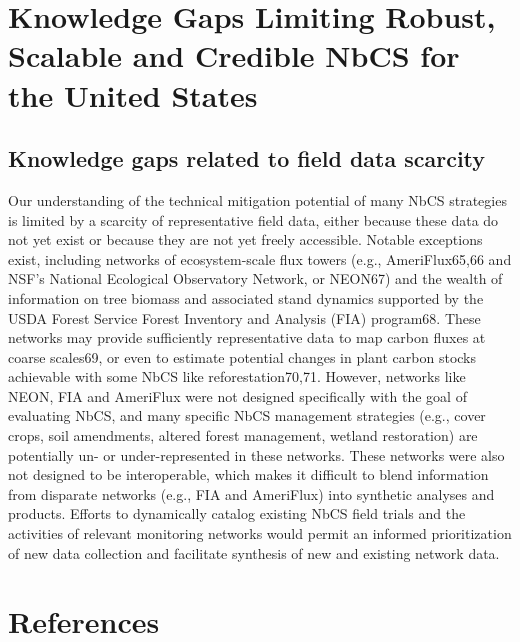 \documentclass[
  letterpaper,
  DIV=11,
  numbers=noendperiod]{scrreprt}
\begin{document}

\hypertarget{sec-knowledge}{%
\chapter{Knowledge Gaps Limiting Robust, Scalable and Credible NbCS for
the United States}\label{sec-knowledge}}

\hypertarget{knowledge-gaps-related-to-field-data-scarcity}{%
\section{Knowledge gaps related to field data
scarcity}\label{knowledge-gaps-related-to-field-data-scarcity}}

Our understanding of the technical mitigation potential of many NbCS
strategies is limited by a scarcity of representative field data, either
because these data do not yet exist or because they are not yet freely
accessible. Notable exceptions exist, including networks of
ecosystem-scale flux towers (e.g., AmeriFlux65,66 and NSF's National
Ecological Observatory Network, or NEON67) and the wealth of information
on tree biomass and associated stand dynamics supported by the USDA
Forest Service Forest Inventory and Analysis (FIA) program68. These
networks may provide sufficiently representative data to map carbon
fluxes at coarse scales69, or even to estimate potential changes in
plant carbon stocks achievable with some NbCS like reforestation70,71.
However, networks like NEON, FIA and AmeriFlux were not designed
specifically with the goal of evaluating NbCS, and many specific NbCS
management strategies (e.g., cover crops, soil amendments, altered
forest management, wetland restoration) are potentially un- or
under-represented in these networks. These networks were also not
designed to be interoperable, which makes it difficult to blend
information from disparate networks (e.g., FIA and AmeriFlux) into
synthetic analyses and products. Efforts to dynamically catalog existing
NbCS field trials and the activities of relevant monitoring networks
would permit an informed prioritization of new data collection and
facilitate synthesis of new and existing network data.


\hypertarget{references}{%
\chapter*{References}\label{references}}
\end{document}
